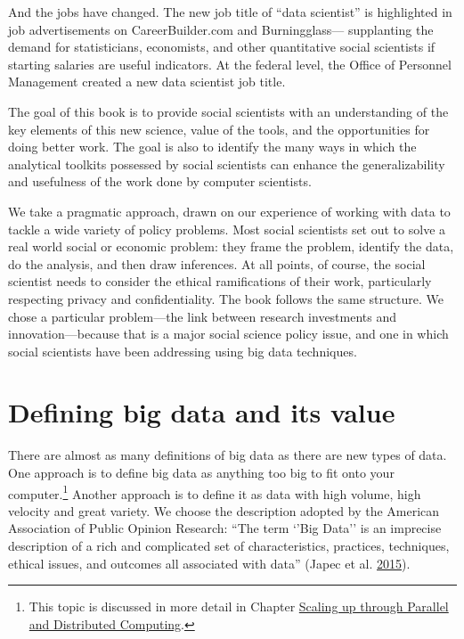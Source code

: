 \documentclass[]{krantz}
\begin{document}
And the jobs have changed. The new job title of ``data scientist'' is
highlighted in job advertisements on CareerBuilder.com and
Burningglass--- supplanting the demand for statisticians, economists,
and other quantitative social scientists if starting salaries are useful
indicators. At the federal level, the Office of Personnel Management
created a new data scientist job title.

The goal of this book is to provide social scientists with an
understanding of the key elements of this new science, value of the
tools, and the opportunities for doing better work. The goal is also to
identify the many ways in which the analytical toolkits possessed by
social scientists can enhance the generalizability and usefulness of the
work done by computer scientists.

We take a pragmatic approach, drawn on our experience of working with
data to tackle a wide variety of policy problems. Most social scientists
set out to solve a real world social or economic problem: they frame the
problem, identify the data, do the analysis, and then draw inferences.
At all points, of course, the social scientist needs to consider the
ethical ramifications of their work, particularly respecting privacy and
confidentiality. The book follows the same structure. We chose a
particular problem---the link between research investments and
innovation---because that is a major social science policy issue, and
one in which social scientists have been addressing using big data
techniques.

\section{Defining big data and its value}\label{sec:1-2}

There are almost as many definitions of big data as there are new types
of data. One approach is to define big data as anything too big to fit
onto your computer.\footnote{This topic is discussed in more detail in
  Chapter \protect\hyperlink{chap:parallel}{Scaling up through Parallel
  and Distributed Computing}.} Another approach is to define it as data
with high volume, high velocity and great variety. We choose the
description adopted by the American Association of Public Opinion
Research: ``The term `'Big Data'' is an imprecise description of a rich
and complicated set of characteristics, practices, techniques, ethical
issues, and outcomes all associated with data'' (Japec et al.
\protect\hyperlink{ref-japec2015big}{2015}).
\end{document}
